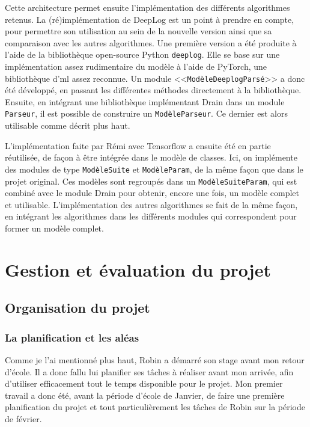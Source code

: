 \documentclass[openany, 11pt]{memoir}
\begin{document}
\bigskip
Cette architecture permet ensuite l'implémentation des différents algorithmes retenus. La (ré)\-implémentation de DeepLog est un point à prendre en compte, pour permettre son utilisation au sein de la nouvelle version ainsi que sa comparaison avec les autres algorithmes. Une première version a été produite à l'aide de la bibliothèque open-source Python \texttt{deeplog}. Elle se base sur une implémentation assez rudimentaire du modèle à l'aide de PyTorch, une bibliothèque d'\gls{ml} assez reconnue. Un module <<\texttt{ModèleDeeplogParsé}>> a donc été développé, en passant les différentes méthodes directement à la bibliothèque. Ensuite, en intégrant une bibliothèque implémentant Drain dans un module \texttt{Parseur}, il est possible de construire un \texttt{ModèleParseur}. Ce dernier est alors utilisable comme décrit plus haut.

L'implémentation faite par Rémi avec Tensorflow a ensuite été en partie réutilisée, de façon à être intégrée dans le modèle de classes. Ici, on implémente des modules de type \texttt{ModèleSuite} et \texttt{ModèleParam}, de la même façon que dans le projet original. Ces modèles sont regroupés dans un \texttt{ModèleSuiteParam}, qui est combiné avec le module Drain pour obtenir, encore une fois, un modèle complet et utilisable. L'implémentation des autres algorithmes se fait de la même façon, en intégrant les algorithmes dans les différents modules qui correspondent pour former un modèle complet.

\newpage
\chapter{Gestion et évaluation du projet}

\section{Organisation du projet}

\subsection{La planification et les aléas}

Comme je l'ai mentionné plus haut, Robin a démarré son stage avant mon retour d'école. Il a donc fallu lui planifier ses tâches à réaliser avant mon arrivée, afin d'utiliser efficacement tout le temps disponible pour le projet. Mon premier travail a donc été, avant la période d'école de Janvier, de faire une première planification du projet et tout particulièrement les tâches de Robin sur la période de février.
\end{document}
